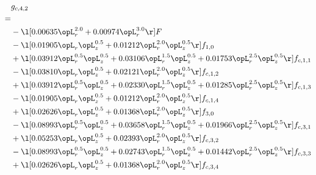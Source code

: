 \begin{alignat}{2} 
\label{eq:g_42_0} 
& g_{c,4,2} \nonumber \\ 
 = \\ 
& - \l[  0.00635 \opL_r^{2.0} +  0.00974 \opL_r^{3.0}  \r] F \nonumber \\ 
& - \l[  0.01905 \opL_r \opL_z^{0.5} +  0.01212 \opL_r^{2.0} \opL_z^{0.5}  \r] f_{1,0} \nonumber \\ 
& + \l[  0.03912 \opL_r^{0.5} \opL_z^{0.5} +  0.03106 \opL_r^{1.5} \opL_z^{0.5} +  0.01753 \opL_r^{2.5} \opL_z^{0.5}  \r] f_{c,1,1} \nonumber \\ 
& - \l[  0.03810 \opL_r \opL_z^{0.5} +  0.02121 \opL_r^{2.0} \opL_z^{0.5}  \r] f_{c,1,2} \nonumber \\ 
& + \l[  0.03912 \opL_r^{0.5} \opL_z^{0.5} +  0.02330 \opL_r^{1.5} \opL_z^{0.5} +  0.01285 \opL_r^{2.5} \opL_z^{0.5}  \r] f_{c,1,3} \nonumber \\ 
& - \l[  0.01905 \opL_r \opL_z^{0.5} +  0.01212 \opL_r^{2.0} \opL_z^{0.5}  \r] f_{c,1,4} \nonumber \\ 
& + \l[  0.02626 \opL_r \opL_z^{0.5} +  0.01368 \opL_r^{2.0} \opL_z^{0.5}  \r] f_{3,0} \nonumber \\ 
& - \l[  0.08993 \opL_r^{0.5} \opL_z^{0.5} +  0.03658 \opL_r^{1.5} \opL_z^{0.5} +  0.01966 \opL_r^{2.5} \opL_z^{0.5}  \r] f_{c,3,1} \nonumber \\ 
& + \l[  0.05253 \opL_r \opL_z^{0.5} +  0.02393 \opL_r^{2.0} \opL_z^{0.5}  \r] f_{c,3,2} \nonumber \\ 
& - \l[  0.08993 \opL_r^{0.5} \opL_z^{0.5} +  0.02743 \opL_r^{1.5} \opL_z^{0.5} +  0.01442 \opL_r^{2.5} \opL_z^{0.5}  \r] f_{c,3,3} \nonumber \\ 
& + \l[  0.02626 \opL_r \opL_z^{0.5} +  0.01368 \opL_r^{2.0} \opL_z^{0.5}  \r] f_{c,3,4} \nonumber \\ 
\end{alignat} 


